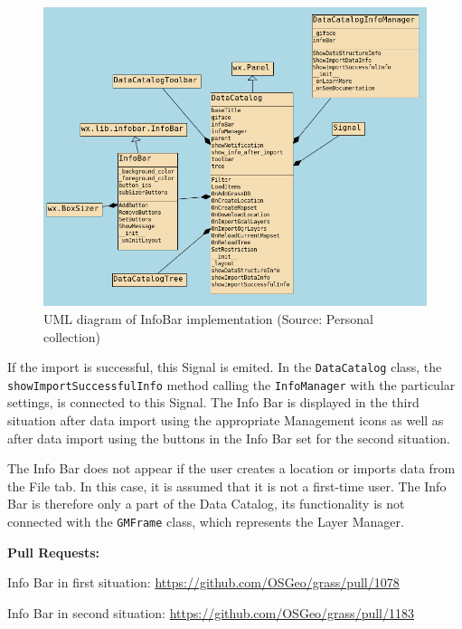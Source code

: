 \documentclass[a4paper,10pt,twoside]{article}
\begin{document}
\vspace{0.3cm}
\begin{figure}[hbt!] 
\begin{center}
\includegraphics[width=17cm]{../pictures/uml_chart.png} 
\caption[UML diagram of InfoBar implementation]{UML diagram of InfoBar implementation (Source: Personal collection)}
\label{fig:uml_chart}
\end{center}
\end{figure}

\noindent If the import is successful, this Signal is emited. In the
\texttt{DataCatalog} class, the \texttt{showImportSuccessfulInfo}
method calling the \texttt{InfoManager} with the particular settings,
is connected to this Signal. The Info Bar is displayed in the third
situation after data import using the appropriate Management icons as
well as after data import using the buttons in the Info Bar set for
the second situation.

The Info Bar does not appear if the user creates a location or imports
data from the File tab. In this case, it is assumed that it is not a
first-time user. The Info Bar is therefore only a part of the Data
Catalog, its functionality is not connected with the \texttt{GMFrame}
class, which represents the Layer Manager.

\newpage
\noindent \textbf{Pull Requests:}

Info Bar in first situation: \url{https://github.com/OSGeo/grass/pull/1078}

Info Bar in second situation: \url{https://github.com/OSGeo/grass/pull/1183}
\end{document}
